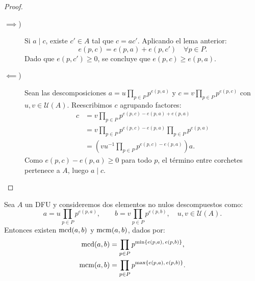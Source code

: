 \begin{proof}~
\begin{description}
    \item[$\implies$)] Si $a \mid c$, existe $c' \in A$ tal que $c = ac'$. Aplicando el lema anterior:
    \[
        e(p,c) = e(p,a) + e(p,c') \quad \forall p \in P.
    \]
    Dado que $e(p,c') \geq 0$, se concluye que $e(p,c) \geq e(p,a)$.

    \item[$\impliedby$)] Sean las descomposiciones $a = u \prod\limits_{p \in P} p^{e(p,a)}$ y $c = v \prod\limits_{p \in P} p^{e(p,c)}$ con $u, v \in \mathcal{U}(A)$. Reescribimos $c$ agrupando factores:
    \begin{align*}
        c &= v \prod\limits_{p \in P} p^{e(p,c) - e(p,a) + e(p,a)} \\
          &= v \prod\limits_{p \in P} p^{e(p,c) - e(p,a)} \prod\limits_{p \in P} p^{e(p,a)} \\
          &= \left(v u^{-1} \prod\limits_{p \in P} p^{e(p,c) - e(p,a)}\right) a.
    \end{align*}
    Como $e(p,c) - e(p,a) \geq 0$ para todo $p$, el término entre corchetes pertenece a $A$, luego $a \mid c$.
\end{description}
\end{proof}

\begin{prop}\label{propExistenMCDDFU}
    Sea $A$ un DFU y consideremos dos elementos no nulos descompuestos como:
    \[
        a = u \prod\limits_{p \in P} p^{e(p,a)}, \qquad b = v \prod\limits_{p \in P} p^{e(p,b)}, \quad u, v \in \mathcal{U}(A).
    \]
    Entonces existen $\operatorname{mcd}(a,b)$ y $\operatorname{mcm}(a,b)$, dados por:
    \begin{align*}
        \operatorname{mcd}(a,b) &= \prod\limits_{p \in P} p^{\min\{e(p,a),\, e(p,b)\}}, \\
        \operatorname{mcm}(a,b) &= \prod\limits_{p \in P} p^{\max\{e(p,a),\, e(p,b)\}}.
    \end{align*}
\end{prop}

